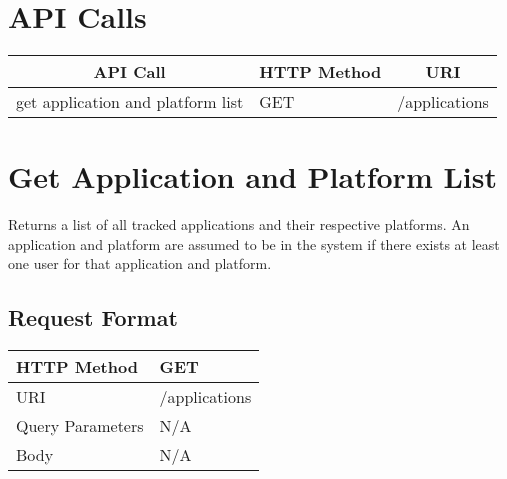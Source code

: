 


\section{API Calls}
\begin{center}
\begin{tabular}{|l||l||l|}
\hline

\multicolumn{1}{|c||}{\textbf{API Call}} &
\multicolumn{1}{c||}{\textbf{HTTP Method}} &
\multicolumn{1}{c|}{\textbf{URI}} \\

\hline
\hline
get application and platform list  & GET & /applications \\
\hline
\end{tabular}
\end{center}


\section{Get Application and Platform List}

Returns a list of all tracked applications and their respective platforms.
An application and platform are assumed to be in the system if there exists
at least one user for that application and platform.

\subsection{Request Format}
\begin{center}
\begin{tabular}{|l||l|}
\hline
HTTP Method & GET           \\
\hline
URI         & /applications \\
\hline
Query Parameters & N/A       \\
\hline
Body        & N/A            \\
\hline
\end{tabular}
\end{center}

